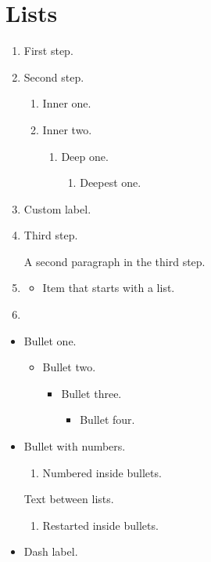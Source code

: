 \documentclass{article}
\begin{document}
\section{Lists}
\begin{enumerate}
\item First step.
\item Second step. \label{it:second}
  \begin{enumerate}
  \item Inner one.
  \item Inner two. \label{it:inner}
    \begin{enumerate}
    \item Deep one. \label{it:deep}
      \begin{enumerate}
      \item Deepest one. \label{it:deepest}
      \end{enumerate}
    \end{enumerate}
  \end{enumerate}
\item[(x)] Custom label.
\item Third step.

  A second paragraph in the third step.
\item
  \begin{itemize}
  \item Item that starts with a list.
  \end{itemize}
\item
\end{enumerate}

\begin{itemize}
\item Bullet one.
  \begin{itemize}
  \item Bullet two.
    \begin{itemize}
    \item Bullet three.
      \begin{itemize}
      \item Bullet four.
      \end{itemize}
    \end{itemize}
  \end{itemize}
\item Bullet with numbers.
  \begin{enumerate}
  \item Numbered inside bullets. \label{it:mixed}
  \end{enumerate}
  Text between lists.
  \begin{enumerate}
  \item Restarted inside bullets.
  \end{enumerate}
\item[--] Dash label.
\end{itemize}
\end{document}
